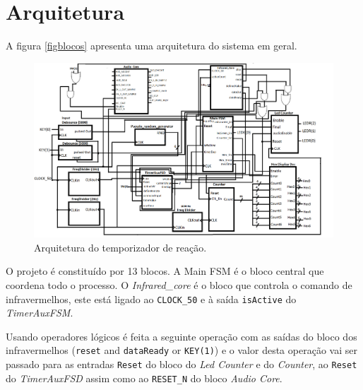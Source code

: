 \documentclass[a4paper,11pt,onecolumn]{report}
\begin{document}
\section{Arquitetura}
A figura \autoref{figblocos} apresenta uma arquitetura do sistema em geral.

\begin{figure}[h]
\centerline{\includegraphics[scale=0.25]{Images/Blockdiagram}}
\caption{Arquitetura do temporizador de reação.}
\label{figblocos}
\end{figure}

O projeto é constituído por 13 blocos. A Main FSM é o bloco central que coordena todo o processo. O \textit{Infrared\_core} é o bloco que controla o comando de infravermelhos, este está ligado ao \texttt{CLOCK\_50} e à saída \texttt{isActive} do \textit{TimerAuxFSM}. 

Usando operadores lógicos é feita a seguinte operação com as saídas do bloco dos infravermelhos (\texttt{reset} and \texttt{dataReady} or \texttt{KEY(1)}) e o valor desta operação vai ser passado para as entradas \texttt{Reset} do bloco do \textit{Led Counter} e do \textit{Counter}, ao \texttt{Reset} do \textit{TimerAuxFSD} assim como ao \texttt{RESET\_N} do bloco \textit{Audio Core}. 
\end{document}
